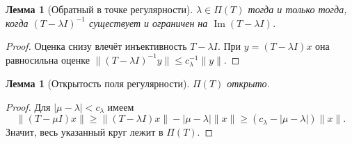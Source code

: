 \documentclass[11pt,a4paper]{article}
\theoremstyle{plain}
\newtheorem{lemma}[theorem]{Лемма}
\theoremstyle{definition}
\newcommand{\id}{I}
\newcommand{\norm}[1]{\lVert#1\rVert}
\begin{document}
\begin{lemma}[Обратный в точке регулярности]
\label{lem:regular-point-inverse}
$\lambda\in\Pi(T)$ тогда и только тогда, когда
$(T-\lambda\id)^{-1}$ существует и ограничен на
$\operatorname{Im}(T-\lambda\id)$.
\end{lemma}
\begin{proof}
Оценка снизу влечёт инъективность $T-\lambda\id$.
При $y=(T-\lambda\id)x$ она равносильна оценке
$\norm{(T-\lambda\id)^{-1}y}\le c_\lambda^{-1}\norm y$.
\end{proof}

\begin{lemma}[Открытость поля регулярности]
\label{lem:regularity-open}
$\Pi(T)$ открыто.
\end{lemma}
\begin{proof}
Для $|\mu-\lambda|<c_\lambda$ имеем
\[
 \norm{(T-\mu\id)x}
 \ge\norm{(T-\lambda\id)x}-|\mu-\lambda|\norm x
 \ge(c_\lambda-|\mu-\lambda|)\norm x.
\]
Значит, весь указанный круг лежит в $\Pi(T)$.
\end{proof}
\end{document}
